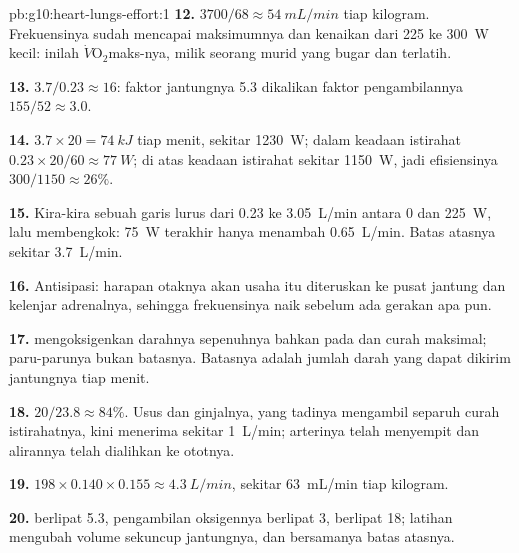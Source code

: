 \begin{solution}{pb:g10:heart-lungs-effort:1}
\textbf{12.} $3700/68 \approx \qty{54}{mL/min}$ tiap kilogram.
Frekuensinya sudah mencapai maksimumnya dan kenaikan dari 225 ke
\qty{300}{W} kecil: inilah $\dot V\!\mathrm{O_2}$maks-nya, milik
seorang murid yang bugar dan terlatih.

\textbf{13.} $3.7/0.23 \approx 16$: faktor jantungnya 5.3 dikalikan
faktor pengambilannya $155/52 \approx 3.0$.

\textbf{14.} $3.7 \times 20 = \qty{74}{kJ}$ tiap menit, sekitar
\qty{1230}{W}; dalam keadaan istirahat $0.23 \times 20/60 \approx \qty{77}{W}$;
di atas keadaan istirahat sekitar \qty{1150}{W}, jadi efisiensinya $300/1150 \approx
26\%$.

\textbf{15.} Kira-kira sebuah garis lurus dari \num{0.23} ke
\qty{3.05}{L/min} antara 0 dan \qty{225}{W}, lalu membengkok:
\qty{75}{W} terakhir hanya menambah \qty{0.65}{L/min}. Batas atasnya
sekitar \qty{3.7}{L/min}.

\textbf{16.} Antisipasi: harapan otaknya akan usaha itu diteruskan ke
pusat jantung dan kelenjar adrenalnya, sehingga frekuensinya naik
sebelum ada gerakan apa pun.

\textbf{17.}  mengoksigenkan darahnya sepenuhnya bahkan pada
 dan curah maksimal; paru-parunya bukan batasnya. Batasnya
adalah jumlah darah yang dapat dikirim jantungnya tiap menit.

\textbf{18.} $20/23.8 \approx 84\%$. Usus dan ginjalnya, yang tadinya
mengambil separuh curah istirahatnya, kini menerima sekitar
\qty{1}{L/min}; arterinya telah menyempit dan alirannya telah
dialihkan ke ototnya.

\textbf{19.} $198 \times 0.140 \times 0.155 \approx \qty{4.3}{L/min}$,
sekitar \qty{63}{mL/min} tiap kilogram.

\textbf{20.}  berlipat 5.3, pengambilan oksigennya
berlipat 3,  berlipat 18; latihan mengubah volume sekuncup
jantungnya, dan bersamanya batas atasnya.
\end{solution}
